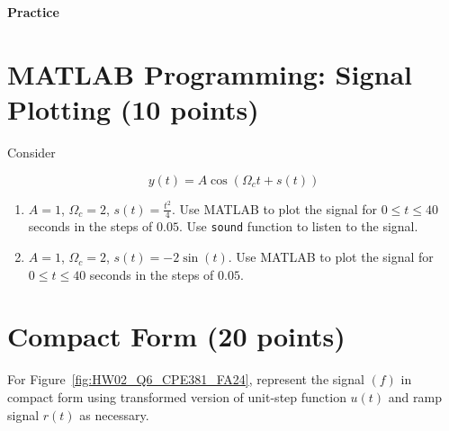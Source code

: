\documentclass[12pt, xcolor=dvipsnames,svgnames,x11names]{article}
\begin{document}
{{\LARGE \textbf{Practice}}}


\section{MATLAB Programming: Signal Plotting (10 points)}

Consider 

$$
y(t) = A\cos(\Omega_c t + s(t))
$$

\begin{enumerate}
    \item $ A = 1$, $\Omega_c = 2$, $s(t) = \tfrac{t^2}{4}$. Use MATLAB to plot the signal for $0 \leq t \leq 40$ seconds in the steps of $0.05$. Use \texttt{sound} function to listen to the signal.
 \item $ A = 1$, $\Omega_c = 2$, $s(t) = -2\sin(t)$. Use MATLAB to plot the signal for $0 \leq t \leq 40$ seconds in the steps of $0.05$. %
\end{enumerate}

%
%
%
%
%
%
%
%
%


\section{Compact Form (20 points)}
For Figure~\ref{fig:HW02_Q6_CPE381_FA24}, represent the signal $(f)$ in compact form using transformed version of unit-step function $u(t)$ and ramp signal $r(t)$ as necessary.
\end{document}
